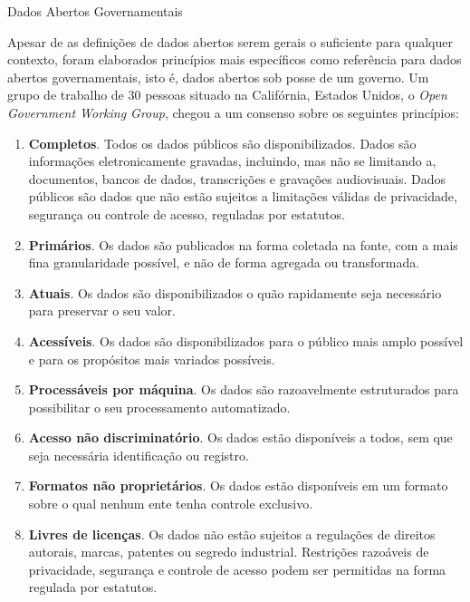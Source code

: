 {\large Dados Abertos Governamentais}

Apesar de as definições de dados abertos serem gerais o suficiente para qualquer contexto, foram elaborados princípios mais específicos como referência para dados abertos governamentais, isto é, dados abertos sob posse de um governo\cite{REF_OGD_PRINCIPLES}. Um grupo de trabalho de 30 pessoas situado na Califórnia, Estados Unidos, o \textit{Open Government Working Group}, chegou a um consenso sobre os seguintes princípios:

\begin{enumerate}
\item \textbf{Completos}. Todos os dados públicos são disponibilizados. Dados são informações eletronicamente gravadas, incluindo, mas não se limitando a, documentos, bancos de dados, transcrições e gravações audiovisuais. Dados públicos são dados que não estão sujeitos a limitações válidas de privacidade, segurança ou controle de acesso, reguladas por estatutos.

\item \textbf{Primários}. Os dados são publicados na forma coletada na fonte, com a mais fina granularidade possível, e não de forma agregada ou transformada.

\item \textbf{Atuais}. Os dados são disponibilizados o quão rapidamente seja necessário para preservar o seu valor.

\item \textbf{Acessíveis}. Os dados são disponibilizados para o público mais amplo possível e para os propósitos mais variados possíveis.

\item \textbf{Processáveis por máquina}. Os dados são razoavelmente estruturados para possibilitar o seu processamento automatizado.

\item \textbf{Acesso não discriminatório}. Os dados estão disponíveis a todos, sem que seja necessária identificação ou registro.

\item \textbf{Formatos não proprietários}. Os dados estão disponíveis em um formato sobre o qual nenhum ente tenha controle exclusivo.

\item \textbf{Livres de licenças}. Os dados não estão sujeitos a regulações de direitos autorais, marcas, patentes ou segredo industrial. Restrições razoáveis de privacidade, segurança e controle de acesso podem ser permitidas na forma regulada por estatutos.
\end{enumerate}

